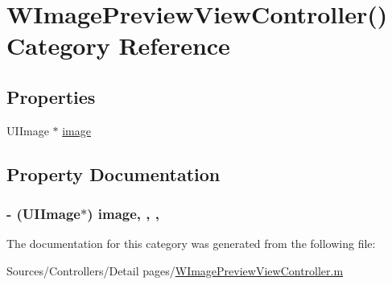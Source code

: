 \hypertarget{category_w_image_preview_view_controller_07_08}{\section{W\-Image\-Preview\-View\-Controller() Category Reference}
\label{category_w_image_preview_view_controller_07_08}
}
\subsection*{Properties}
\begin{DoxyCompactItemize}
\item 
U\-I\-Image $\ast$ \hyperlink{category_w_image_preview_view_controller_07_08_a3acb702dc737c6dfecf0daa693aa3ead}{image}
\end{DoxyCompactItemize}


\subsection{Property Documentation}
\hypertarget{category_w_image_preview_view_controller_07_08_a3acb702dc737c6dfecf0daa693aa3ead}{
\subsubsection[{image}]{\setlength{\rightskip}{0pt plus 5cm}-\/ (U\-I\-Image$\ast$) image\hspace{0.3cm}{\ttfamily [read]}, {\ttfamily [write]}, {\ttfamily [nonatomic]}, {\ttfamily [retain]}}}\label{category_w_image_preview_view_controller_07_08_a3acb702dc737c6dfecf0daa693aa3ead}


The documentation for this category was generated from the following file\-:\begin{DoxyCompactItemize}
\item 
Sources/\-Controllers/\-Detail pages/\hyperlink{_w_image_preview_view_controller_8m}{W\-Image\-Preview\-View\-Controller.\-m}\end{DoxyCompactItemize}
